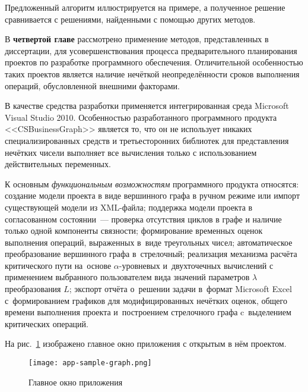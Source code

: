 Предложенный алгоритм иллюстрируется на примере, а полученное решение сравнивается с решениями, найденными с помощью других методов.

В \textbf{четвертой главе} рассмотрено применение методов, представленных в диссертации, для усовершенствования процесса предварительного планирования проектов по разработке программного обеспечения. Отличительной особенностью таких проектов является наличие нечёткой неопределённости сроков выполнения операций, обусловленной внешними факторами. 

В качестве средства разработки применяется интегрированная среда Microsoft Visual Studio 2010. Особенностью разработанного программного продукта <<CSBusinessGraph>> является то, что он не использует никаких специализированных средств и третьесторонних библиотек для представления нечётких чисели выполняет все вычисления только с использованием действительных переменных.

К основным \textit{функциональным возможностям} программного продукта относятся: создание модели проекта в виде вершинного графа в ручном режиме или импорт существующей модели из XML-файла; поддержка модели проекта в согласованном состоянии~--- проверка отсутствия циклов в графе и наличие только одной компоненты связности; формирование временных оценок выполнения операций, выраженных в~виде треугольных чисел; автоматическое преобразование вершинного графа в~стрелочный; реализация механизма расчёта критического пути на~основе $\alpha$-уровневых и~двухточечных вычислений с применением выбранного пользователем  вида значений параметров $\lambda$ преобразования $L$; экспорт отчёта о~решении задачи в~формат Microsoft Excel с~формированием графиков для модифицированных нечётких оценок, общего времени выполнения проекта и~построением стрелочного графа c~выделением критических операций.

На рис.~\ref{fig:app-sample-graph} изображено главное окно приложения с открытым в нём проектом.
\begin{figure}[t!] 
  \center
  \texttt{[image: app-sample-graph.png]}
  \caption{Главное окно приложения} 
  \label{fig:app-sample-graph}
\end{figure}
